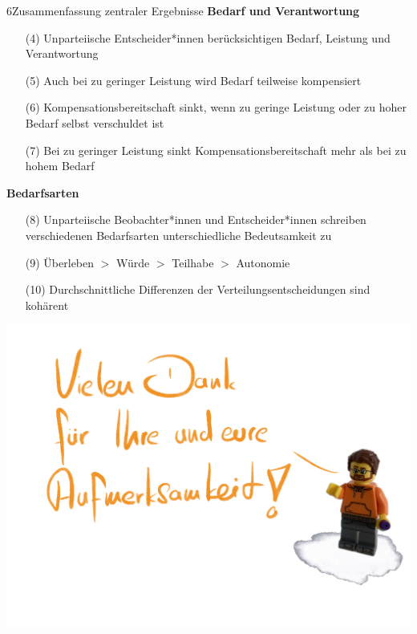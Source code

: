 \documentclass[xcolor=table,9pt,aspectratio=169]{beamer}
\begin{document}
\begin{frame}{\vspace*{10mm}6\hspace*{1em}Zusammenfassung zentraler Ergebnisse}
\textbf{Bedarf und Verantwortung}\\
\medskip
\begin{itemize}
   \item[(4)] Unparteiische Entscheider*innen berücksichtigen Bedarf, Leistung und Verantwortung
   \item[(5)] Auch bei zu geringer Leistung wird Bedarf teilweise kompensiert
   \item[(6)] Kompensationsbereitschaft sinkt, wenn zu geringe Leistung oder zu hoher Bedarf selbst verschuldet ist
   \item[(7)] Bei zu geringer Leistung sinkt Kompensationsbereitschaft mehr als bei zu hohem Bedarf
\end{itemize}
\vspace{2em}
\textbf{Bedarfsarten}\\
\medskip
\begin{itemize}
   \item[(8)] Unparteiische Beobachter*innen und Entscheider*innen schreiben verschiedenen Bedarfsarten unterschiedliche Bedeutsamkeit zu
   \item[(9)] Überleben $>$ Würde $>$ Teilhabe $>$ Autonomie
   \item[(10)] Durchschnittliche Differenzen der Verteilungsentscheidungen sind kohärent
   \end{itemize}
\end{frame}


\begin{frame}{}
\begin{center}
   \includegraphics[width=0.8\linewidth]{figures/slides_thanks.pdf}
\end{center}
\end{frame}
\end{document}
